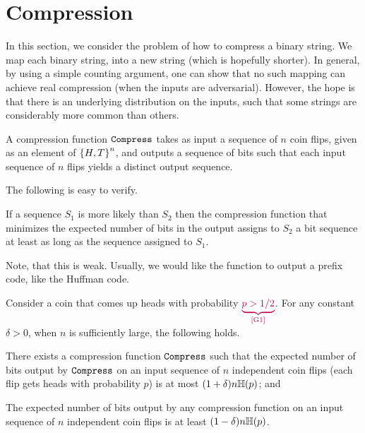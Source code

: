 
\section{Compression}

In this section, we consider the problem of how to compress a binary
string. We map each binary string, into a new string (which is
hopefully shorter).  In general, by using a simple counting argument,
one can show that no such mapping can achieve real compression (when
the inputs are adversarial). However, the hope is that there is an
underlying distribution on the inputs, such that some strings are
considerably more common than others.

\begin{defn}
    A compression function $\mathtt{Compress}$ takes as input a sequence
    of $n$ coin flips, given as an element of $\left\{ {H,T} \right\}^n$, and
    outputs a sequence of bits such that each input sequence of $n$
    flips yields a distinct output sequence.
\end{defn}

The following is easy to verify.
\begin{lemma}
    If a sequence $S_1$ is more likely than $S_2$ then the compression
    function that minimizes the expected number of bits in the output
    assigns to $S_2$ a bit sequence at least as long as the sequence
    assigned to $S_1$. 

\end{lemma}



Note, that this is weak. Usually, we would like the function to output
a prefix code, like the Huffman code.
\begin{theorem}
    Consider a coin that comes up heads with probability
    $\markX{G1}{p > 1/2}$. For
    any constant $\delta >0$, when $n$ is sufficiently large, the
    following holds.
    \begin{compactenumi}
        \item There exists a compression function $\mathtt{Compress}$ such
        that the expected number of bits output by $\mathtt{Compress}$ on
        an input sequence of $n$ independent coin flips (each flip
        gets heads with probability $p$) is at most $(1+\delta) n
        \Entropy{p}$; and

        \item The expected number of bits output by any compression
        function on an input sequence of $n$ independent coin flips is
        at least $(1-\delta)n \Entropy{p}$.
    \end{compactenumi}
\end{theorem}

